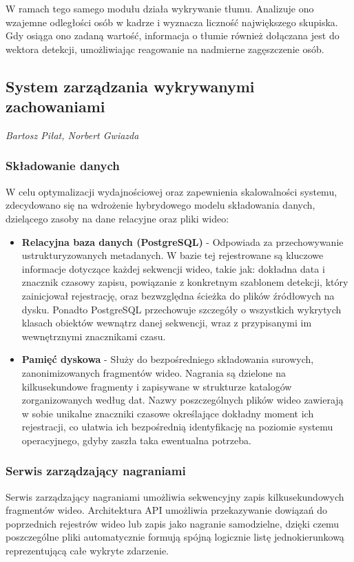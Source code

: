 W ramach tego samego modułu działa wykrywanie tłumu. Analizuje ono wzajemne odległości osób w kadrze i wyznacza liczność największego skupiska. Gdy osiąga ono zadaną wartość, informacja o tłumie również dołączana jest do wektora detekcji, umożliwiając reagowanie na nadmierne zagęszczenie osób.


\subsection{System zarządzania wykrywanymi zachowaniami}
\small \textit{Bartosz Piłat, Norbert Gwiazda}
\subsubsection{Składowanie danych}
W celu optymalizacji wydajnościowej oraz zapewnienia skalowalności systemu, zdecydowano się na wdrożenie hybrydowego modelu składowania danych, dzielącego zasoby na dane relacyjne oraz pliki wideo:

\begin{itemize}
    \item \textbf{Relacyjna baza danych (PostgreSQL)} - Odpowiada za przechowywanie ustrukturyzowanych metadanych. W bazie tej rejestrowane są kluczowe informacje dotyczące każdej sekwencji wideo, takie jak: dokładna data i znacznik czasowy zapisu, powiązanie z konkretnym szablonem detekcji, który zainicjował rejestrację, oraz bezwzględna ścieżka do plików źródłowych na dysku. Ponadto PostgreSQL przechowuje szczegóły o wszystkich wykrytych klasach obiektów wewnątrz danej sekwencji, wraz z przypisanymi im wewnętrznymi znacznikami czasu.
    \item \textbf{Pamięć dyskowa} - Służy do bezpośredniego składowania surowych, zanonimizowanych fragmentów wideo. Nagrania są dzielone na kilkusekundowe fragmenty i zapisywane w strukturze katalogów zorganizowanych według dat. Nazwy poszczególnych plików wideo zawierają w sobie unikalne znaczniki czasowe określające dokładny moment ich rejestracji, co ułatwia ich bezpośrednią identyfikację na poziomie systemu operacyjnego, gdyby zaszła taka ewentualna potrzeba.
\end{itemize}

\subsubsection{Serwis zarządzający nagraniami}
Serwis zarządzający nagraniami umożliwia sekwencyjny zapis kilkusekundowych fragmentów wideo. Architektura API umożliwia przekazywanie dowiązań do poprzednich rejestrów wideo lub zapis jako nagranie samodzielne, dzięki czemu poszczególne pliki automatycznie formują spójną logicznie listę jednokierunkową reprezentującą całe wykryte zdarzenie.

